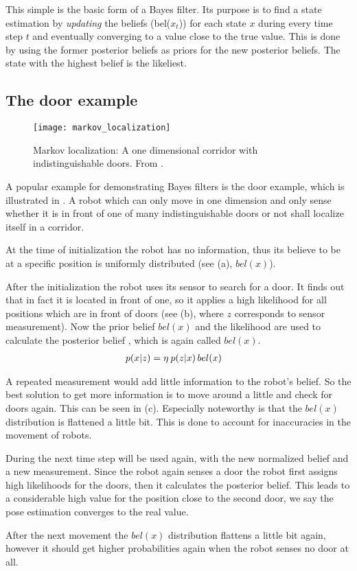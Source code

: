 \documentclass[Thesis.tex]{subfiles}
\begin{document}
This simple  is the basic form of a Bayes filter. Its purpose is to find a state estimation by \emph{updating} the beliefs (bel($x_t$)) for each state $x$ during every time step $t$ and eventually converging to a value close to the true value. This is done by using the former posterior beliefs as priors for the new posterior beliefs.
The state with the highest belief is the likeliest.

\subsection{The door example}
\begin{figure}
  \centering
  \texttt{[image: markov\_localization]}
  \caption{Markov localization: A one dimensional corridor with indistinguishable doors. From \cite[p.~6]{ThrunBurgardFox:2005}.}
  \label{fig:markov_localization_one_dimension}
\end{figure}

A popular example for demonstrating Bayes filters is the door example, which is illustrated in . A robot which can only move in one dimension and only sense whether it is in front of one of many indistinguishable doors or not shall localize itself in a corridor. 

At the time of initialization the robot has no information, thus its believe to be at a specific position is uniformly distributed (see (a), $bel(x)$).

After the initialization the robot uses its sensor to search for a door. It finds out that in fact it is located in front of one, so it applies a high likelihood for all positions which are in front of doors (see (b),  where $z$ corresponds to sensor measurement). Now the prior belief $bel(x)$ and the likelihood  are used to calculate the posterior belief , which is again called $bel(x)$.
%
\begin{align}
p\!\left({x}\middle|{z}\right) &= \eta\: p\!\left({z}\middle|{x}\right) bel(x) \label{eq:door_bayes}
\end{align}

A repeated measurement would add little information to the robot's belief. So the best solution to get more information is to move around a little and check for doors again. This can be seen in (c). Especially noteworthy is that the $bel(x)$ distribution is flattened a little bit. This is done to account for inaccuracies in the movement of robots.

During the next time step  will be used again, with the new normalized belief and a new measurement. Since the robot again senses a door the robot first assigns high likelihoods for the doors, then it calculates the posterior belief. This leads to a considerable high value for the position close to the second door, we say the pose estimation converges to the real value. 

After the next movement the $bel(x)$ distribution flattens a little bit again, however it should get higher probabilities again when the robot senses no door at all.
\end{document}
